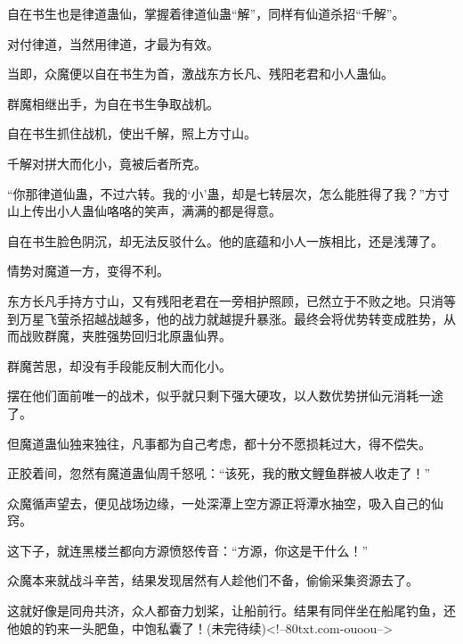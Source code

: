 \begin{this_body}
自在书生也是律道蛊仙，掌握着律道仙蛊“解”，同样有仙道杀招“千解”。

对付律道，当然用律道，才最为有效。

当即，众魔便以自在书生为首，激战东方长凡、残阳老君和小人蛊仙。

群魔相继出手，为自在书生争取战机。

自在书生抓住战机，使出千解，照上方寸山。

千解对拼大而化小，竟被后者所克。

“你那律道仙蛊，不过六转。我的‘小’蛊，却是七转层次，怎么能胜得了我？”方寸山上传出小人蛊仙咯咯的笑声，满满的都是得意。

自在书生脸色阴沉，却无法反驳什么。他的底蕴和小人一族相比，还是浅薄了。

情势对魔道一方，变得不利。

东方长凡手持方寸山，又有残阳老君在一旁相护照顾，已然立于不败之地。只消等到万星飞萤杀招越战越多，他的战力就越提升暴涨。最终会将优势转变成胜势，从而战败群魔，夹胜强势回归北原蛊仙界。

群魔苦思，却没有手段能反制大而化小。

摆在他们面前唯一的战术，似乎就只剩下强大硬攻，以人数优势拼仙元消耗一途了。

但魔道蛊仙独来独往，凡事都为自己考虑，都十分不愿损耗过大，得不偿失。

正胶着间，忽然有魔道蛊仙周千怒吼：“该死，我的散文鲤鱼群被人收走了！”

众魔循声望去，便见战场边缘，一处深潭上空方源正将潭水抽空，吸入自己的仙窍。

这下子，就连黑楼兰都向方源愤怒传音：“方源，你这是干什么！”

众魔本来就战斗辛苦，结果发现居然有人趁他们不备，偷偷采集资源去了。

这就好像是同舟共济，众人都奋力划桨，让船前行。结果有同伴坐在船尾钓鱼，还他娘的钓来一头肥鱼，中饱私囊了！(未完待续)<!--80txt.com-ouoou-->

\end{this_body}

